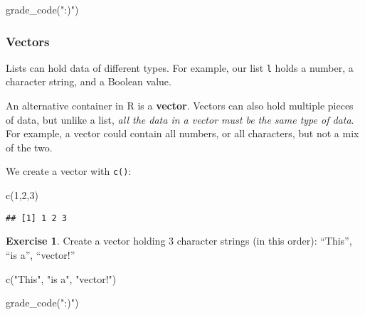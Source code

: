 \documentclass[
]{article}
\newenvironment{Shaded}{\begin{snugshade}}{\end{snugshade}}
\newcommand{\DecValTok}[1]{\textcolor[rgb]{0.00,0.00,0.81}{#1}}
\newcommand{\FunctionTok}[1]{\textcolor[rgb]{0.00,0.00,0.00}{#1}}
\newcommand{\NormalTok}[1]{#1}
\newcommand{\StringTok}[1]{\textcolor[rgb]{0.31,0.60,0.02}{#1}}
\theoremstyle{definition}
\theoremstyle{definition}
\theoremstyle{definition}
\newtheorem{exercise}{Exercise}[section]
\theoremstyle{definition}
\theoremstyle{remark}
\begin{document}
\begin{Shaded}
\begin{Highlighting}[]
\FunctionTok{grade\_code}\NormalTok{(}\StringTok{":)"}\NormalTok{)}
\end{Highlighting}
\end{Shaded}

\hypertarget{vectors}{%
\subsubsection{Vectors}\label{vectors}}

Lists can hold data of different types. For example, our list \texttt{l} holds a number, a character string, and a Boolean value.

An alternative container in R is a \textbf{vector}. Vectors can also hold multiple pieces of data, but unlike a list, \emph{all the data in a vector must be the same type of data}. For example, a vector could contain all numbers, or all characters, but not a mix of the two.

We create a vector with \texttt{c()}:

\begin{Shaded}
\begin{Highlighting}[]
\FunctionTok{c}\NormalTok{(}\DecValTok{1}\NormalTok{,}\DecValTok{2}\NormalTok{,}\DecValTok{3}\NormalTok{)}
\end{Highlighting}
\end{Shaded}

\begin{verbatim}
## [1] 1 2 3
\end{verbatim}

\begin{exercise}
Create a vector holding 3 character strings (in this order): ``This'', ``is a'', ``vector!''
\end{exercise}

\begin{Shaded}
\begin{Highlighting}[]
\FunctionTok{c}\NormalTok{(}\StringTok{"This"}\NormalTok{, }\StringTok{"is a"}\NormalTok{, }\StringTok{"vector!"}\NormalTok{)}
\end{Highlighting}
\end{Shaded}

\begin{Shaded}
\begin{Highlighting}[]
\FunctionTok{grade\_code}\NormalTok{(}\StringTok{":)"}\NormalTok{)}
\end{Highlighting}
\end{Shaded}
\end{document}

